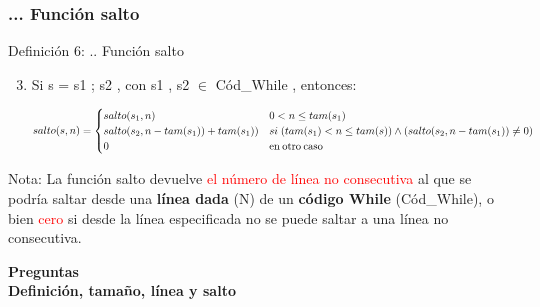 \documentclass[xcolor=table]{beamer}
\begin{document}
\begin{frame}[fragile]\frametitle{...  Función salto} \footnotesize
\begin{block}{Definición 6: .. Función salto}
\end{block}

\begin{enumerate}
    \setcounter{enumi}{2}
    \item Si s = s1 ; s2 , con s1 , s2 $\in$ Cód\_While , entonces:

         \scriptsize\begin{equation*} salto(s,n) = 
            \begin{cases} 
                    salto(s_1,n)            & 0< n \leq tam(s_1)\\
                    salto(s_2,n-tam(s_1))+tam(s_1))   & si\; (tam(s_1) < n \leq tam (s)) \wedge (salto (s_2,n-tam(s_1))\neq 0) \\
                    0                & \text{en\:otro\:caso}
            \end{cases} \end{equation*}   
        
\end{enumerate}


Nota: La función salto devuelve \textcolor{red}{el número de línea no consecutiva} al que se podría saltar desde una \textbf{línea dada} (N) de un \textbf{código While} (Cód\_While), o bien \textcolor{red}{cero} si desde la línea especificada no se puede saltar a una línea no consecutiva.

\end{frame}

\begin{frame}  \Large

\begin{center}
    \textbf{Preguntas\\ Definición, tamaño, línea y salto }
\end{center}

\end{frame} 
\end{document}
